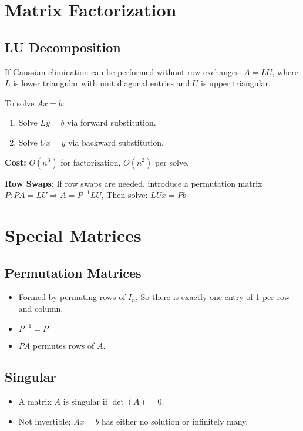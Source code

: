 \documentclass[8pt, letterpaper]{extarticle}
\begin{document}
\begin{multicols*}{3}
\begin{itemize}
      
  \end{itemize}

  \section{Matrix Factorization}
  \subsection{LU Decomposition}
  If Gaussian elimination can be performed without row exchanges:
  $A = LU$,
  where $ L $ is lower triangular with unit diagonal entries and $ U $ is upper triangular.

  To solve $ Ax = b $:
  \begin{enumerate}
    \item Solve $ Ly = b $ via forward substitution.
    \item Solve $ Ux = y $ via backward substitution.
  \end{enumerate}
  \textbf{Cost:} $ O(n^3) $ for factorization, $ O(n^2) $ per solve.

  \textbf{Row Swaps}:
  If row swaps are needed, introduce a permutation matrix 
  $P:PA = LU \Rightarrow A = P^{-1}LU$,
  Then solve: $ LUx = Pb $

  \section{Special Matrices}
  \subsection{Permutation Matrices}
  \begin{itemize}
    \item Formed by permuting rows of $I_n$, So there is exactly one entry of 1
      per row and column.
    \item $P^{-1} = P^\top$
    \item $PA$ permutes rows of $A$.
  \end{itemize}

  \subsection{Singular}
  \begin{itemize}
    \item A matrix $A$ is singular if $\det(A) = 0$.
    \item Not invertible; $ Ax = b $ has either no solution or infinitely many.
  \end{itemize}


\end{multicols*}
\end{document}
